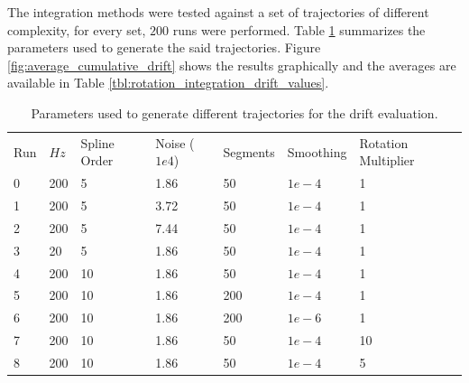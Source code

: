 \documentclass[10pt,a4paper]{article}
\numberwithin{equation}{section}
\begin{document}
The integration methods were tested against a set of trajectories of different complexity, for every set, $200$ runs were performed. Table \ref{tbl:rotation_integration_drift_run_parameters} summarizes the parameters used to generate the said trajectories. Figure \ref{fig:average_cumulative_drift} shows the results graphically and the averages are available in Table \ref{tbl:rotation_integration_drift_values}.

\begin{table}
\begin{center}
\begin{tabular}{ l | l | l | l | l | l | l}
Run & $Hz$ & Spline Order & Noise ($1e4$) & Segments & Smoothing & Rotation Multiplier \\
0 & 200 & 5 & 1.86 & 50 & $1e-4$ & 1 \\
1 & 200 & 5 & 3.72 & 50 &  $1e-4$ & 1 \\
2 & 200 & 5 & 7.44 & 50 &  $1e-4$ & 1 \\
3 & 20  & 5 & 1.86 & 50 &  $1e-4$ & 1 \\
4 & 200  & 10 & 1.86 & 50 &  $1e-4$ & 1 \\
5 & 200  & 10 & 1.86 & 200 &  $1e-4$ & 1 \\
6 & 200  & 10 & 1.86 & 200 & $1e-6$ & 1 \\
7 & 200  & 10 & 1.86 & 50 & $1e-4$ & 10 \\
8 & 200  & 10 & 1.86 & 50 & $1e-4$ & 5
\end{tabular}
\end{center}
\caption{Parameters used to generate different trajectories for the drift evaluation.}
\label{tbl:rotation_integration_drift_run_parameters}
\end{table}
\end{document}
